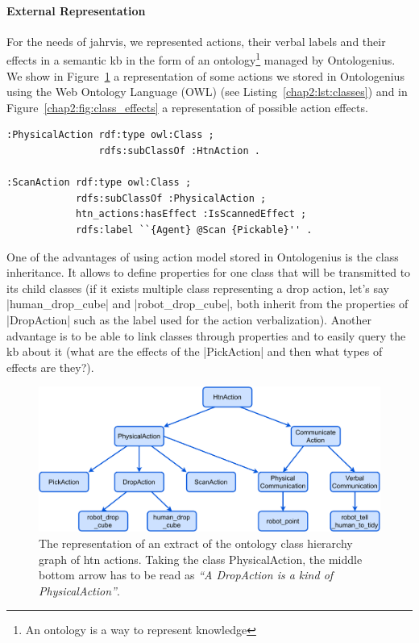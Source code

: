\documentclass[a4paper,11pt,twoside]{StyleThese}
\begin{document}
\paragraph{External Representation}
For the needs of \acrshort{jahrvis}, we represented actions, their verbal labels and their effects in a semantic \acrshort{kb} in the form of an ontology\footnote{An ontology is a way to represent knowledge} managed by Ontologenius. We show in Figure~\ref{chap2:fig:class_actions} a representation of some actions we stored in Ontologenius using the Web Ontology Language (OWL) (see Listing~\ref{chap2:lst:classes}) and in Figure~\ref{chap2:fig:class_effects} a representation of possible action effects.

\begin{lstlisting}[style=OwlTurtle, label={chap2:lst:classes}, caption={Description of ontology classes in the OWL language using the Turle syntax.} ]
:PhysicalAction	rdf:type owl:Class ;
				rdfs:subClassOf :HtnAction .

:ScanAction	rdf:type owl:Class ;
			rdfs:subClassOf :PhysicalAction ;
			htn_actions:hasEffect :IsScannedEffect ;
			rdfs:label ``{Agent} @Scan {Pickable}'' .

\end{lstlisting}

One of the advantages of using action model stored in Ontologenius is the class inheritance. It allows to define properties for one class that will be transmitted to its child classes (\eg if it exists multiple class representing a drop action, let's say |human_drop_cube| and |robot_drop_cube|, both inherit from the properties of |DropAction| such as the label used for the action verbalization). Another advantage is to be able to link classes through properties and to easily query the \acrshort{kb} about it (\eg what are the effects of the |PickAction| and then what types of effects are they?).

\begin{figure}[!ht]
	\includegraphics[width=\linewidth]{figures/chapter2/class_actions.pdf}
	\caption{The representation of an extract of the ontology class hierarchy graph of \acrshort{htn} actions. Taking the class PhysicalAction, the middle bottom arrow has to be read	as \textit{``A DropAction is a kind of PhysicalAction''}.}
	\label{chap2:fig:class_actions}
\end{figure}
\end{document}
